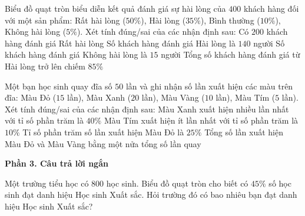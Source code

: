 \begin{ex} %
Biểu đồ quạt tròn biểu diễn kết quả đánh giá sự hài lòng của $400$ khách hàng đối với một sản phẩm: Rất hài lòng ($50\%$), Hài lòng ($35\%$), Bình thường ($10\%$), Không hài lòng ($5\%$). Xét tính đúng/sai của các nhận định sau:
\choiceTF
{\True Có $200$ khách hàng đánh giá Rất hài lòng}
{\True Số khách hàng đánh giá Hài lòng là $140$ người}
{Số khách hàng đánh giá Không hài lòng là $15$ người}
{\True Tổng số khách hàng đánh giá từ Hài lòng trở lên chiếm $85\%$}
\end{ex}

\begin{ex} %
Một bạn học sinh quay đĩa số $50$ lần và ghi nhận số lần xuất hiện các màu trên đĩa: Màu Đỏ ($15$ lần), Màu Xanh ($20$ lần), Màu Vàng ($10$ lần), Màu Tím ($5$ lần). Xét tính đúng/sai của các nhận định sau:
\choiceTF
{\True Màu Xanh xuất hiện nhiều lần nhất với tỉ số phần trăm là $40\%$}
{\True Màu Tím xuất hiện ít lần nhất với tỉ số phần trăm là $10\%$}
{Tỉ số phần trăm số lần xuất hiện Màu Đỏ là $25\%$}
{\True Tổng số lần xuất hiện Màu Đỏ và Màu Vàng bằng một nửa tổng số lần quay}
\end{ex}

\textbf{Phần 3. Câu trả lời ngắn}

\begin{ex} %
Một trường tiểu học có $800$ học sinh. Biểu đồ quạt tròn cho biết có $45\%$ số học sinh đạt danh hiệu Học sinh Xuất sắc. Hỏi trường đó có bao nhiêu bạn đạt danh hiệu Học sinh Xuất sắc?
\end{ex}

